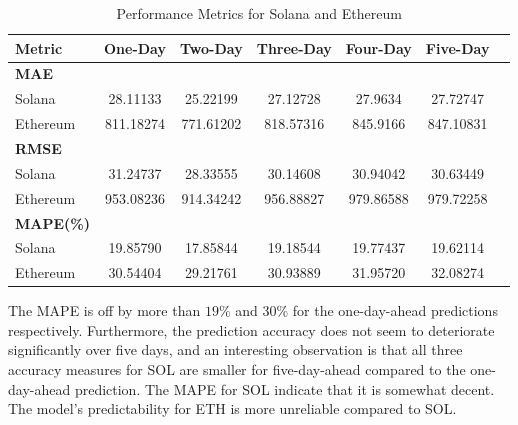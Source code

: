\begin{table}[H]
\centering
\begin{tabular}{lcccccc}
\toprule
\textbf{Metric} & \textbf{One-Day} & \textbf{Two-Day} & \textbf{Three-Day} & \textbf{Four-Day} & \textbf{Five-Day} \\
\midrule
\textbf{MAE} & & & & & \\
Solana        & 28.11133 & 25.22199 & 27.12728 & 27.9634 & 27.72747 \\
Ethereum      & 811.18274 & 771.61202 & 818.57316 & 845.9166 & 847.10831 \\
\midrule
\textbf{RMSE} & & & & & \\
Solana        & 31.24737 & 28.33555 & 30.14608 & 30.94042 & 30.63449 \\
Ethereum      & 953.08236 & 914.34242 & 956.88827 & 979.86588 & 979.72258 \\
\midrule
\textbf{MAPE(\%)} & & & & & \\
Solana        & 19.85790 & 17.85844 & 19.18544 & 19.77437 & 19.62114 \\
Ethereum      & 30.54404 & 29.21761 & 30.93889 & 31.95720 & 32.08274 \\
\bottomrule
\end{tabular}
\caption{Performance Metrics for Solana and Ethereum}
\label{table:SOL_ETH_MAE_RMSE_MAPE}
\end{table}

\noindent  
The MAPE is off by more than $19\%$ and $30\%$ for the one-day-ahead predictions respectively. Furthermore, the prediction accuracy does not seem to deteriorate significantly over five days, and an interesting observation is that all three accuracy measures for SOL are smaller for five-day-ahead compared to the one-day-ahead prediction. The MAPE for SOL indicate that it is somewhat decent. The model's predictability for ETH is more unreliable compared to SOL.
\pause

